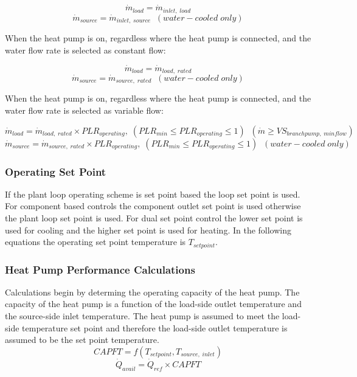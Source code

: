 \begin{equation}
\dot{m}_{load} = \dot{m}_{inlet,\;load}
\end{equation}
\begin{equation}
\dot{m}_{source} =  \dot{m}_{inlet,\;source}\;\; (water-cooled\;only)
\end{equation}

When the heat pump is on, regardless where the heat pump is connected, and the water flow rate is selected as constant flow:

\begin{equation}
\dot{m}_{load} = \dot{m}_{load,\; rated}
\end{equation}
\begin{equation}
\dot{m}_{source} = \dot{m}_{source,\; rated}\;\; (water-cooled\;only)
\end{equation}

When the heat pump is on, regardless where the heat pump is connected, and the water flow rate is selected as variable flow:

\begin{equation}
\dot{m}_{load} = \dot{m}_{load,\; rated} \times PLR_{operating},\;{(PLR_{min} \le PLR_{operating} \le 1)}\;\; (\dot{m} \ge VS_{branchpump,\; minflow})
\end{equation}
\begin{equation}
\dot{m}_{source} = \dot{m}_{source,\; rated} \times PLR_{operating},\;{(PLR_{min} \le PLR_{operating} \le 1)}\;\; (water-cooled\;only)
\end{equation}

\subsubsection{Operating Set Point}\label{eir-air-to-water-heat-pumps-operating-set-point}
If the plant loop operating scheme is set point based the loop set point is used. For component based controls the component outlet set point is used otherwise the plant loop set point is used. For dual set point control the lower set point is used for cooling and the higher set point is used for heating. In the following equations the operating set point temperature is $T_{setpoint}$.

\subsubsection{Heat Pump Performance Calculations}\label{eir-air-to-water-heat-pumps-heat-pump-performance-calculations}
Calculations begin by determing the operating capacity of the heat pump. The capacity of the heat pump is a function of the load-side outlet temperature and the source-side inlet temperature. The heat pump is assumed to meet the load-side temperature set point and therefore the load-side outlet temperature is assumed to be the set point temperature.
\begin{equation}
CAPFT = f(T_{setpoint}, T_{source,\; inlet})
\end{equation}
\begin{equation}
\dot{Q}_{avail} = \dot{Q}_{ref} \times CAPFT
\end{equation}

